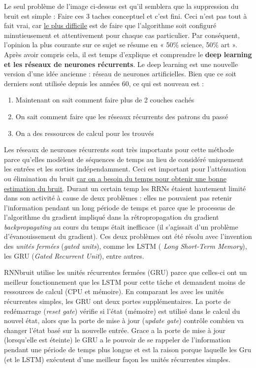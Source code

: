 \documentclass[conference,onecolumn]{IEEEtran}
\begin{document}
Le seul problème de l’image ci-dessus est qu’il semblera que la suppression du bruit est simple : Faire ces 3 taches conceptuel et c’est fini. Ceci n’est pas tout à fait vrai, car \underline{le plus difficile} est de faire que l’algorithme soit configuré minutieusement et attentivement pour chaque cas particulier. Par conséquent, l’opinion la plus courante sur ce sujet se résume en « 50\% science, 50\% art ».
Après avoir compris cela, il est temps d’explique et comprendre le \textbf{deep learning et les réseaux de neurones récurrents}. Le deep learning est une nouvelle version d’une idée ancienne : réseau de neurones artificielles. Bien que ce soit derniers sont utilisée depuis les années 60, ce qui est nouveau est :

\begin{enumerate}
    \item Maintenant on sait comment faire plus de 2 couches cachés
    \item On sait comment faire que les réseaux récurrents des patrons du passé
    \item On a des ressources de calcul pour les trouvés
\end{enumerate}

Les réseaux de neurones récurrents sont très importants pour cette méthode parce qu’elles modèlent de séquences de temps au lieu de considéré uniquement les entrées et les sorties indépendamment. Ceci est important pour l’atténuation ou élimination du bruit \underline{car on a besoin du temps pour obtenir une bonne estimation du bruit}. Durant un certain temp les RRNs étaient  hautement limité dans son activité à cause de deux problèmes : elles ne pouvaient pas retenir l’information pendant un long période de temps et parce que le processus de l’algorithme du gradient impliqué dans la rétropropagation du gradient \textit{backpropagating} au cours du temps était inefficace (il s’agissait d’un problème d’évanouissement du gradient). Ces deux problèmes ont été résolu avec l’invention des \textit{unités fermées} (\textit{gated units}), comme les LSTM (\textit{ Long Short-Term Memory}), les GRU (\textit{Gated Recurrent Unit}), entre autres.

RNNbruit utilise les unités récurrentes fermées (GRU) parce que celles-ci ont un meilleur fonctionnement que les LSTM pour cette tâche et demandent moins de ressources de calcul (CPU et mémoire). En comparant les avec les unités récurrentes simples, les GRU ont deux portes supplémentaires. La porte de redémarrage (\textit{reset gate}) vérifie si l’état (mémoire) est utilisé dans le calcul du nouvel état, alors que la porte de mise à jour (\textit{update gate}) contrôle combien va changer l’état basé sur la nouvelle entrée. Grace a la  porte de mise à jour (lorsqu’elle est éteinte) le GRU a le pouvoir de se rappeler de l’information pendant une période de temps plus longue et est la raison porque laquelle les Gru (et le LSTM) exécutent d’une meilleur façon les unités récurrentes simples.
\end{document}
